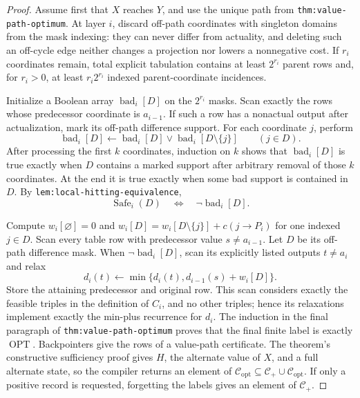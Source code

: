 \documentclass{article}
\begin{document}
\begin{proof}
Assume first that \(X\) reaches \(Y\), and use the unique path from \texttt{thm:value-path-optimum}.  At layer \(i\), discard off-path coordinates with singleton domains from the mask indexing: they can never differ from actuality, and deleting such an off-cycle edge neither changes a projection nor lowers a nonnegative cost.  If \(r_i\) coordinates remain, total explicit tabulation contains at least \(2^{r_i}\) parent rows and, for \(r_i>0\), at least \(r_i2^{r_i}\) indexed parent-coordinate incidences.

Initialize a Boolean array \(\operatorname{bad}_i[D]\) on the \(2^{r_i}\) masks.  Scan exactly the rows whose predecessor coordinate is \(a_{i-1}\).  If such a row has a nonactual output after actualization, mark its off-path difference support.  For each coordinate \(j\), perform
\[
 \operatorname{bad}_i[D]\leftarrow
 \operatorname{bad}_i[D]\lor\operatorname{bad}_i[D\setminus\{j\}]
 \qquad(j\in D).
\]
After processing the first \(k\) coordinates, induction on \(k\) shows that \(\operatorname{bad}_i[D]\) is true exactly when \(D\) contains a marked support after arbitrary removal of those \(k\) coordinates.  At the end it is true exactly when some bad support is contained in \(D\).  By \texttt{lem:local-hitting-equivalence},
\[
 \operatorname{Safe}_i(D)\quad\Longleftrightarrow\quad
 \neg\operatorname{bad}_i[D].
\]

Compute \(w_i[\varnothing]=0\) and \(w_i[D]=w_i[D\setminus\{j\}]+c(j\to P_i)\) for one indexed \(j\in D\).  Scan every table row with predecessor value \(s\ne a_{i-1}\).  Let \(D\) be its off-path difference mask.  When \(\neg\operatorname{bad}_i[D]\), scan its explicitly listed outputs \(t\ne a_i\) and relax
\[
 d_i(t)\leftarrow\min\{d_i(t),d_{i-1}(s)+w_i[D]\}.
\]
Store the attaining predecessor and original row.  This scan considers exactly the feasible triples in the definition of \(C_i\), and no other triples; hence its relaxations implement exactly the min-plus recurrence for \(d_i\).  The induction in the final paragraph of \texttt{thm:value-path-optimum} proves that the final finite label is exactly \(\operatorname{OPT}\).  Backpointers give the rows of a value-path certificate.  The theorem's constructive sufficiency proof gives \(H\), the alternate value of \(X\), and a full alternate state, so the compiler returns an element of \(\mathcal C_{\mathrm{opt}}\subseteq\mathcal C_{+}\cup\mathcal C_{\mathrm{opt}}\).  If only a positive record is requested, forgetting the labels gives an element of \(\mathcal C_{+}\).


\end{proof}
\end{document}
